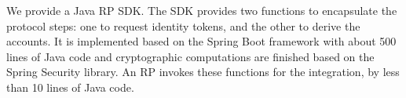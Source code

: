 


We provide a Java RP SDK.
The SDK provides two functions to encapsulate the protocol steps:
 one to request identity tokens,
    and the other to derive the accounts. %
It is implemented based on the Spring Boot framework  with about 500 lines of Java code
 and cryptographic computations are finished based on the Spring Security library.
An RP invokes these functions for the integration,
    by less than 10 lines of Java code.

